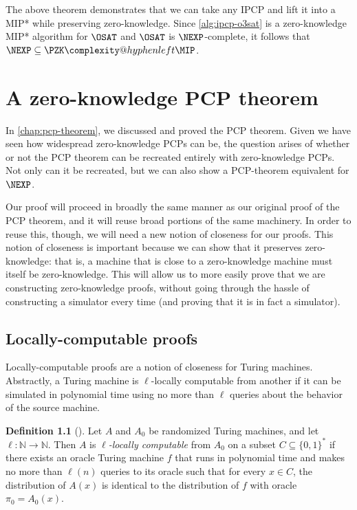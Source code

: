 \documentclass[english,12pt]{reedthesis}
\makeatletter
\theoremstyle{plain}
\theoremstyle{definition}
\newtheorem{defn}[defn]{Definition}
\theoremstyle{remark}
\newcommand{\PZKMIP}{%
  \PZK\complexity@hyphenleft\MIP
}
\makeatother
\begin{document}
The above theorem demonstrates that we can take any IPCP and lift it into a MIP*
while preserving zero-knowledge. Since \cref{alg:ipcp-o3sat} is a zero-knowledge
MIP* algorithm for $\OSAT$ and $\OSAT$ is $\NEXP$-complete, it follows that
$\NEXP \subseteq \PZKMIP$.

\chapter{A zero-knowledge PCP theorem}\label{chap:zk-pcp-theorem}

In \cref{chap:pcp-theorem}, we discussed and proved the PCP theorem. Given we
have seen how widespread zero-knowledge PCPs can be, the question arises of
whether or not the PCP theorem can be recreated entirely with zero-knowledge
PCPs. Not only can it be recreated, but we can also show a PCP-theorem
equivalent for $\NEXP$.

Our proof will proceed in broadly the same manner as our original proof of the
PCP theorem, and it will reuse broad portions of the same machinery. In order to
reuse this, though, we will need a new notion of closeness for our proofs. This
notion of closeness is important because we can show that it preserves
zero-knowledge: that is, a machine that is close to a zero-knowledge machine
must itself be zero-knowledge. This will allow us to more easily prove that we
are constructing zero-knowledge proofs, without going through the hassle of
constructing a simulator every time (and proving that it is in fact a
simulator).

\section{Locally-computable proofs}\label{sec:loc-comp-proof}

Locally-computable proofs are a notion of closeness for Turing machines.
Abstractly, a Turing machine is $\ell$-locally computable from another if it can be
simulated in polynomial time using no more than $\ell$ queries about the behavior
of the source machine.

\begin{defn}[{\cite[Def.\ 3.1]{GOS25}}]\label{def:loc-comp}%
   Let $A$ and $A_{0}$ be randomized Turing
  machines, and let $\ell\colon \mathbb{N} \rightarrow \mathbb{N}$. Then $A$ is \emph{$\ell$-locally computable}
  from $A_{0}$ on a subset $C \subseteq \{0, 1\}^{*}$ if there exists an oracle Turing
  machine $f$ that runs in polynomial time and makes no more than $\ell(n)$ queries
  to its oracle such that for every $x \in C$, the distribution of $A(x)$ is
  identical to the distribution of $f$ with oracle $\pi_{0} = A_{0}(x)$.
\end{defn}
\end{document}
